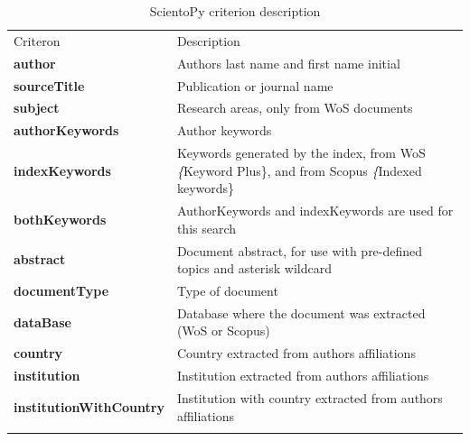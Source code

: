 \documentclass[10pt,letterpaper]{article}
\begin{document}
\begin{table}[h]
	\centering
	\caption{ScientoPy criterion description}
	\label{table_criterion}
	
	\renewcommand{\arraystretch}{1.5}
	\begin{tabular}{p{3.5cm} p{10cm}}
	\hline\noalign{\smallskip}
	Criteron       & Description                             \\
	\noalign{\smallskip}\hline\noalign{\smallskip}                                                                         
	\textbf{author}         & Authors last name and first name initial                                                                       \\
	\textbf{sourceTitle}    & Publication or journal name                                                                                    \\
	\textbf{subject}        & Research areas, only from WoS documents                                                                        \\
	\textbf{authorKeywords} & Author keywords                                                                                                \\
	\textbf{indexKeywords}  & Keywords generated by the index, from WoS \textit\{Keyword Plus\}, and from Scopus \textit\{Indexed keywords\} \\
	\textbf{bothKeywords}   & AuthorKeywords and indexKeywords are used for this search                                                      \\
	\textbf{abstract}       & Document abstract, for use with pre-defined topics and asterisk wildcard\\
	\textbf{documentType}   & Type of document                                                                                               \\
	\textbf{dataBase}       & Database where the document was extracted (WoS or Scopus)                                                      \\
	\textbf{country}        & Country extracted from authors affiliations                                                                    \\
	\textbf{institution}    & Institution extracted from authors affiliations                                                                \\
	\textbf{institutionWithCountry}    & Institution with country extracted from authors affiliations                                        \\
	\noalign{\smallskip}\hline
	\end{tabular}
	
\end{table}
\end{document}
